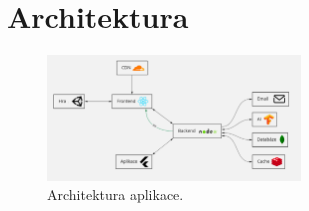 \section{Architektura}

\begin{figure}[h]
    \centering %
    \includegraphics[width=0.6\textwidth]{img/architektura.png} %
    \caption{Architektura aplikace.} %
    \label{fig:architektura} %
\end{figure}